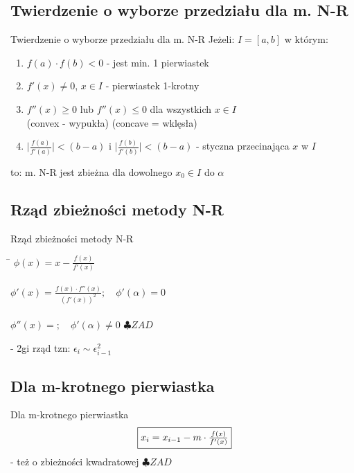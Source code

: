 \subsection{Twierdzenie o wyborze przedziału dla m. N-R}
\begin{frame}{Twierdzenie o wyborze przedziału dla m. N-R}
	Jeżeli: $I = \left[a, b\right]$ w którym:
	\begin{enumerate}
		\item $f(a) \cdot f(b) < 0$ - jest min. 1 pierwiastek
		\item $f'(x) \neq 0$, $x \in I$ - pierwiastek 1-krotny
		\item $f''(x) \geq 0$ lub $f''(x) \leq 0$ dla wszystkich $x \in I$\\
			(convex - wypukła) (concave = wklęsła)
		\item $\lvert \frac{f(a)}{f'(a)} \rvert < (b - a)$ i $\lvert \frac{f(b)}{f'(b)} \rvert < (b - a)$ - styczna przecinająca $x$ w $I$
	\end{enumerate}
	to:
	m. N-R jest zbieżna dla dowolnego $x_{0} \in I$ do $\alpha$
\end{frame}
\subsection{Rząd zbieżności metody N-R}
\begin{frame}{Rząd zbieżności metody N-R}
	\begin{tabbing}
		\qquad\qquad \= $\phi(x) = x - \frac{f(x)}{f'(x)}$\\\\
		\> $\phi'(x) = \frac{f(x) \cdot f''(x)}{(f'(x))^{2}}; \quad \phi'(\alpha) = 0$\\\\
		\> $\phi''(x) = ; \quad \phi'(\alpha) \neq 0$ \quad $\clubsuit ZAD$\\
	\end{tabbing}
	- 2gi rząd tzn: $\epsilon_{i} \sim \epsilon_{i-1}^{2}$
\end{frame}
\subsection{Dla m-krotnego pierwiastka}
\begin{frame}{Dla m-krotnego pierwiastka}
	\[
		\fbox{$x_{i} = x_{i-1} - m \cdot \frac{f(x)}{f'(x)}$}
	\]
	\linebreak
	- też o zbieżności kwadratowej \quad $\clubsuit ZAD$
\end{frame}
